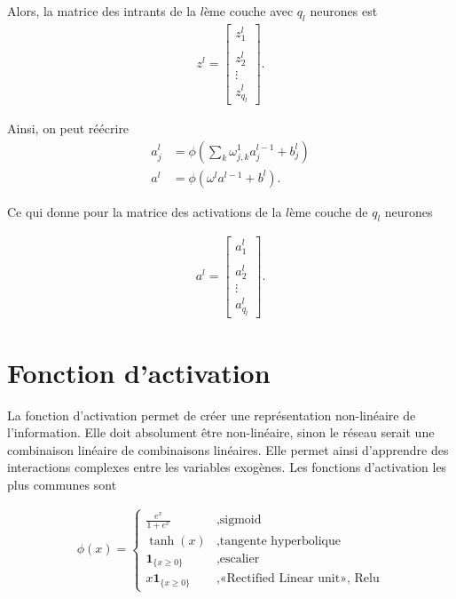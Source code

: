 Alors, la matrice des intrants de la $l$ème couche avec $q_l$ neurones est
\begin{align*}
z^l=
\begin{bmatrix}
z_1^l\\
\\
z_2^l\\
\vdots \\
z_{q_l}^l
\end{bmatrix}.
\end{align*}

Ainsi, on peut réécrire
\begin{align*}
a_j^l&= \phi \left( \sum_k \omega_{j,k}^1 a_j^{l-1} + b_j^l \right)\\
a^l&= \phi \left( \omega^l a^{l-1} + b^l \right).
\end{align*}

Ce qui donne pour la matrice des activations de la $l$ème couche de $q_l$ neurones

\begin{align*}
a^l=
\begin{bmatrix}
a_1^l\\
\\
a_2^l\\
\vdots \\
a_{q_l}^l
\end{bmatrix}.
\end{align*}


\section{Fonction d'activation}
\label{sec:RN:activation}

La fonction d'activation permet de créer une représentation non-linéaire de l'information.  Elle doit absolument être non-linéaire, sinon le réseau serait une combinaison linéaire de combinaisons linéaires. Elle permet ainsi d'apprendre des interactions complexes entre les variables exogènes. Les fonctions d'activation les plus communes sont

\begin{align*}
\phi(x)=
\begin{cases}
\frac{e^{x}}{1+e^{x}} &, \text{sigmoid} \\
\tanh (x) &,\text{tangente hyperbolique}\\
\mathbf{1}_{\{x \geq 0\}} &, \text{escalier} \\
x \mathbf{1}_{\{x \geq 0\}} &, \text{«Rectified Linear unit», Relu}
\end{cases}
\end{align*}

